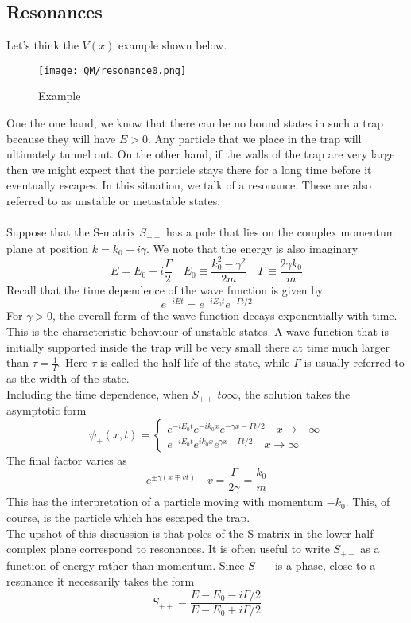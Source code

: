 \subsection{Resonances}
Let's think the $V(x)$ example shown below.
\begin{figure}[!h]
\centering
\texttt{[image: QM/resonance0.png]}
\caption{Example}
\end{figure} 
One the one hand, we know that there can be no bound states in such a trap because they will have $E > 0$. 
Any particle that we place in the trap will ultimately tunnel out. 
On the other hand, if the walls of the trap are very large then we might expect that the particle stays there for a long time before it eventually escapes. 
In this situation, we talk of a resonance. These are also referred to as unstable or metastable states.
\\ \\
Suppose that the S-matrix $S_{++}$ has a pole that lies on the complex momentum plane at position $k = k_0 - i\gamma$. We note that the energy is also imaginary
\[E = E_0 - i\frac{\Gamma}{2} \quad E_0 \equiv \frac{k_0^2-\gamma^2}{2m} \quad \Gamma \equiv \frac{2\gamma k_0}{m}\]
Recall that the time dependence of the wave function is given by
\[e^{-iEt} = e^{-iE_0t}e^{-\Gamma t/2}\]
For $\gamma > 0$, the overall form of the wave function decays exponentially with time. This is the characteristic behaviour of unstable states. 
A wave function that is initially supported inside the trap will be very small there at time much larger than $\tau = \frac{1}{\Gamma}$. Here $\tau$ is called the half-life of the state, while $\Gamma$ is usually referred to as the width of the state.
\\
Including the time dependence, when $S_{++}\ to \infty$, the solution takes the asymptotic form
\[\psi_+(x,t) = \begin{cases} e^{-iE_0t}e^{-ik_0x}e^{-\gamma x - \Gamma t/2} \quad x\to -\infty \\  e^{-iE_0t}e^{ik_0x}e^{\gamma x - \Gamma t/2} \quad x\to \infty \end{cases}\]
The final factor varies as
\[e^{\pm\gamma(x\mp vt)} \quad v = \frac{\Gamma}{2\gamma} = \frac{k_0}{m}\]
This has the interpretation of a particle moving with momentum $-k_0$. This, of course, is the particle which has escaped the trap.
\\
The upshot of this discussion is that poles of the S-matrix in the lower-half complex plane correspond to resonances. It is often useful to write $S_{++}$ as a function of energy rather than momentum. Since $S_{++}$ is a phase, close to a resonance it necessarily takes the form
\[S_{++} = \frac{E-E_0-i\Gamma/2}{E-E_0+i\Gamma/2}\]


